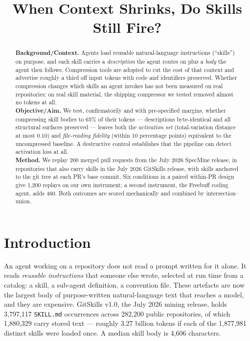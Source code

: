 \documentclass[10pt,conference]{IEEEtran}
\begin{document}
\title{When Context Shrinks, Do Skills Still Fire?}

\author{%
}

\maketitle

\begin{abstract}
\textbf{Background/Context.} Agents load reusable natural-language instructions (``skills'') on purpose, and each skill carries a \emph{description} the agent routes on plus a \emph{body} the agent then follows. Compression tools are adopted to cut the cost of that context and advertise roughly a third off input tokens with code and identifiers preserved. Whether compression changes which skills an agent invokes has not been measured on real repositories; on real skill material, the shipping compressor we tested removed almost no tokens at all.\\
\textbf{Objective/Aim.} We test, confirmatorily and with pre-specified margins, whether compressing skill bodies to 65\% of their tokens --- descriptions byte-identical and all structural surfaces preserved --- leaves both the \emph{activation set} (total-variation distance at most 0.10) and \emph{file-reading fidelity} (within 10 percentage points) equivalent to the uncompressed baseline. A destructive control establishes that the pipeline can detect activation loss at all.\\
\textbf{Method.} We replay 200 merged pull requests from the July 2026 SpecMine release, in repositories that also carry skills in the July 2026 GitSkills release, with skills anchored to the git tree at each PR's base commit. Six conditions in a paired within-PR design give 1{,}200 replays on our own instrument; a second instrument, the Freebuff coding agent, adds 460. Both outcomes are scored mechanically and combined by intersection--union.
\end{abstract}

\section{Introduction}

An agent working on a repository does not read a prompt written for it alone. It reads \emph{reusable instructions} that someone else wrote, selected at run time from a catalog: a skill, a sub-agent definition, a convention file. These artefacts are now the largest body of purpose-written natural-language text that reaches a model, and they are expensive. GitSkills v1.0, the July 2026 mining release, holds 3{,}797{,}117 \texttt{SKILL.md} occurrences across 282{,}200 public repositories, of which 1{,}880{,}329 carry stored text --- roughly 3.27 billion tokens if each of the 1{,}877{,}981 distinct skills were loaded once. A median skill body is 4{,}606 characters.
\end{document}
